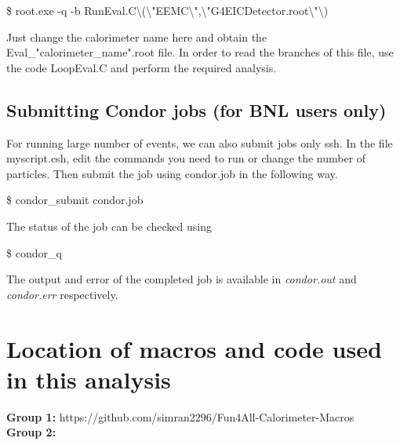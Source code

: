 \$  root.exe -q -b RunEval.C\textbackslash(\textbackslash"EEMC\textbackslash",\textbackslash"G4EICDetector.root\textbackslash"\textbackslash)

Just change the calorimeter name here and obtain the Eval\_"calorimeter\_name".root file. In order to read the branches of this file, use the code LoopEval.C and perform the required analysis.

\subsection{Submitting Condor jobs (for BNL users only)}
For running large number of events, we can also submit jobs only ssh. In the file myscript.csh, edit the commands you need to run or change the number of particles. Then submit the job using condor.job in the following way.

\$ condor\_submit condor.job

The status of the job can be checked using 

\$ condor\_q 

The output and error of the completed job is available in \textit{condor.out} and \textit{condor.err} respectively.







\section{Location of macros and code used in this analysis}

\textbf{Group 1:}  https://github.com/simran2296/Fun4All-Calorimeter-Macros\\
\textbf{Group 2:}